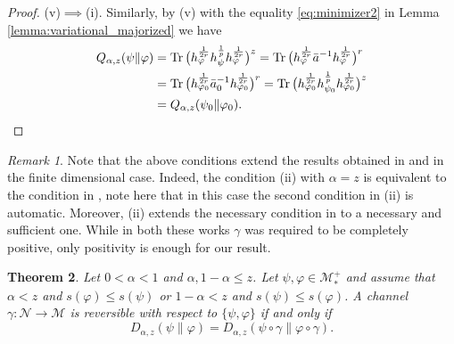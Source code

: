 \documentclass[12pt]{article}
\newtheorem{theorem}{Theorem}[section]
\theoremstyle{definition}
\theoremstyle{remark}
\newtheorem{remark}[theorem]{Remark}
\numberwithin{equation}{section}
\def\Me{\mathcal M}
\def\Ne{\mathcal N}
\def \Tr{\mathrm{Tr}\,}
\def\ffi{\varphi}
\begin{document}
\begin{proof}
(v)$\implies$(i).\enspace
Similarly, by (v) with the equality \eqref{eq:minimizer2} in Lemma
\ref{lemma:variational_majorized} we have
\begin{align*}
Q_{\alpha,z}(\psi\|\ffi)
&=\Tr\bigl(h_\ffi^{1\over2r}h_\psi^{1\over p}h_\ffi^{1\over2r}\bigr)^z
=\Tr\bigl(h_\ffi^{1\over2r}\bar a^{-1}h_\ffi^{1\over2r}\bigr)^{r} \\
&=\Tr\bigl(h_{\ffi_0}^{1\over2r}\bar a_0^{-1}h_{\ffi_0}^{1\over2r}\bigr)^{r}
=\Tr\bigl(h_{\ffi_0}^{1\over2r}h_{\psi_0}^{1\over p}h_{\ffi_0}^{1\over2r}\bigr)^z \\
&=Q_{\alpha,z}(\psi_0\|\ffi_0).
\end{align*}
\end{proof}


\begin{remark}\label{rem:conditions} Note that the above conditions extend the results
obtained in \cite{leditzky2017data} and \cite{zhang2020equality} in
the finite dimensional case.
Indeed, the condition (ii) with $\alpha=z$ is equivalent to the condition in \cite[Thm.
1]{leditzky2017data}, note here that in this case the second condition in (ii) is
automatic. Moreover, (ii) extends the necessary condition in \cite[Thm. 1.2
(2)]{zhang2020equality} to a necessary and sufficient one. While in both these
 works $\gamma$ was required to be completely positive,  only
positivity is enough for our result. 

\end{remark}





\begin{theorem}\label{thm:suffle1} Let $0<\alpha<1$ and $\alpha,1-\alpha\le
z$. Let $\psi,\varphi\in \Me_*^+$ and assume that $\alpha<z$ and $s(\ffi)\le
s(\psi)$ or $1-\alpha<z$ and $s(\psi)\le s(\ffi)$. 
A channel $\gamma:\Ne \to \Me$ is reversible with respect to
$\{\psi,\varphi\}$ if and only if
\[
D_{\alpha,z}(\psi\|\varphi)=D_{\alpha,z}(\psi\circ\gamma\|\varphi\circ\gamma).
\]

\end{theorem}
\end{document}
